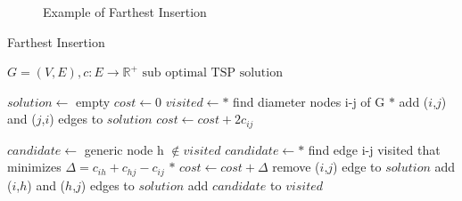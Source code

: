 \begin{figure}[!h]
    \centering
    \caption{Example of Farthest Insertion} \label{fig:extra}
\end{figure}

\begin{algorithm}[h!]
    \caption{Farthest Insertion}\label{algo:extramileage}
    \begin{algorithmic}[1]
    \Require $G = (V,E), c:E \to \mathbb{R}^+$
    \Ensure $\text{sub optimal TSP solution}$


    \State $solution \gets$ empty
    \State $cost \gets 0$
    \State $visited \gets  *$ find diameter nodes i-j of G $*$
    \State add ($i$,$j$) and ($j$,$i$) edges to $solution$
    \State $cost \gets cost + 2 c_{ij}$
   




    \State $candidate \gets $ generic node h $ \notin visited$
    \State $candidate \gets *$ find edge i-j visited that minimizes $\Delta = c_{ih} + c_{hj} - c_{ij}$ $*$
    \State $cost \gets cost + \Delta$
    \State remove ($i$,$j$) edge to $solution$
    \State add ($i$,$h$) and ($h$,$j$) edges to $solution$
    \State add $candidate$ to $visited$


    \EndWhile






    \end{algorithmic}
\end{algorithm}

